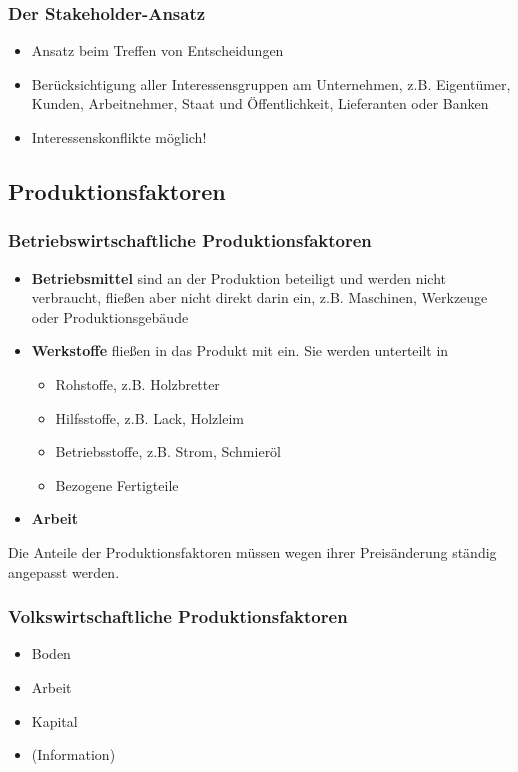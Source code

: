 \documentclass[titlepage,parskip=half]{scrartcl}
\begin{document}
\subsubsection{Der Stakeholder-Ansatz}
\begin{itemize}
    \item Ansatz beim Treffen von Entscheidungen
    \item Berücksichtigung aller Interessensgruppen am Unternehmen, z.B. Eigentümer, Kunden, Arbeitnehmer, Staat und Öffentlichkeit, Lieferanten oder Banken
    \item Interessenskonflikte möglich!
\end{itemize}

\subsection{Produktionsfaktoren}
\subsubsection{Betriebswirtschaftliche Produktionsfaktoren}
\begin{itemize}
    \item \textbf{Betriebsmittel} sind an der Produktion beteiligt und werden nicht verbraucht, fließen aber nicht direkt darin ein, z.B. Maschinen, Werkzeuge oder Produktionsgebäude
    \item \textbf{Werkstoffe} fließen in das Produkt mit ein. Sie werden unterteilt in
    \begin{itemize}
        \item Rohstoffe, z.B. Holzbretter
        \item Hilfsstoffe, z.B. Lack, Holzleim
        \item Betriebsstoffe, z.B. Strom, Schmieröl
        \item Bezogene Fertigteile
    \end{itemize}
    \item \textbf{Arbeit}
\end{itemize}
Die Anteile der Produktionsfaktoren müssen wegen ihrer Preisänderung ständig angepasst werden.
\subsubsection{Volkswirtschaftliche Produktionsfaktoren}
\begin{itemize}
    \item Boden
    \item Arbeit
    \item Kapital
    \item (Information)
\end{itemize}
\end{document}
